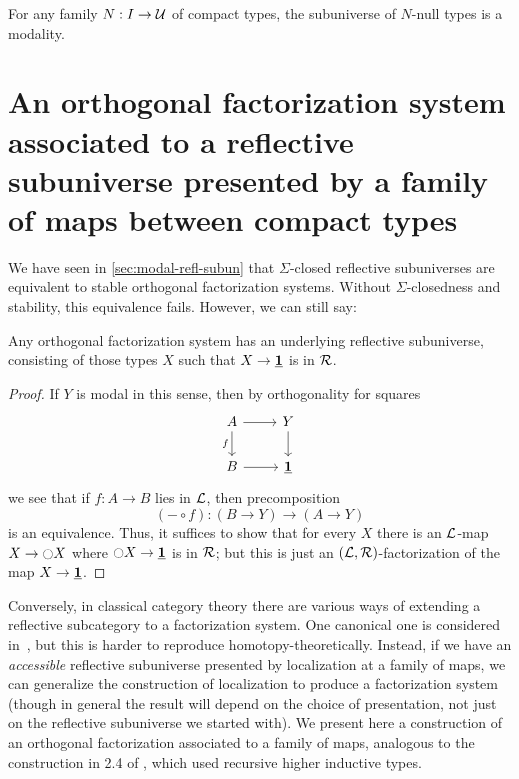 \begin{cor}
For any family $N:I\to \mathcal{U}$ of compact types, the subuniverse of $N$-null types is a modality.
\end{cor}

\section{An orthogonal factorization system associated to a reflective subuniverse presented by a family of maps between compact types}
\label{sec:nonstable-factsys}

We have seen in \cref{sec:modal-refl-subun} that $\Sigma$-closed reflective subuniverses are equivalent to stable orthogonal factorization systems.
Without $\Sigma$-closedness and stability, this equivalence fails.
However, we can still say:

\begin{lem}
  Any orthogonal factorization system has an underlying reflective subuniverse, consisting of those types $X$ such that $X\to\underline{\mathbf{1}}$ is in $\mathcal{R}$.
\end{lem}
\begin{proof}
  If $Y$ is modal in this sense, then by orthogonality for squares
  \[
  \begin{tikzcd}
    A \ar[d,"f"'] \ar[r] & Y \ar[d] \\ B \ar[r] & \unit
  \end{tikzcd}
  \]
  we see that if $f:A\to B$ lies in $\mathcal{L}$, then precomposition
  \[ (-\circ f) : (B\to Y) \to (A\to Y) \]
  is an equivalence.
  Thus, it suffices to show that for every $X$ there is an $\mathcal{L}$-map $X\to {\ensuremath{\ocircle}} X$ where ${\ocircle} X\to \underline{\mathbf{1}}$ is in $\mathcal{R}$; but this is just an $(\mathcal{L},\mathcal{R})$-factorization of the map $X\to\underline{\mathbf{1}}$.
\end{proof}

Conversely, in classical category theory there are various ways of extending a reflective subcategory to a factorization system.
One canonical one is considered in~\cite{chk:reflocfact}, but this is harder to reproduce homotopy-theoretically.
Instead, if we have an \emph{accessible} reflective subuniverse presented by localization at a family of maps, we can generalize the construction of localization to produce a factorization system (though in general the result will depend on the choice of presentation, not just on the reflective subuniverse we started with). We present here a construction of an orthogonal factorization associated to a family of maps, analogous to the construction in 2.4 of \cite{RijkeShulmanSpitters}, which used recursive higher inductive types.  

